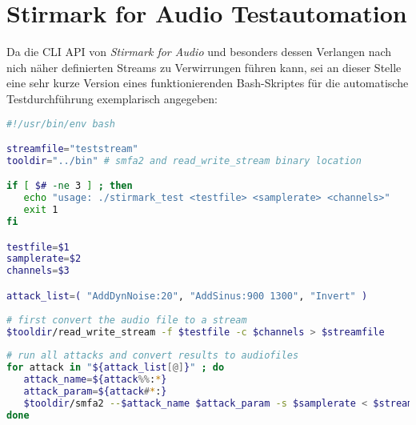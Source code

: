\chapter{Stirmark for Audio Testautomation}
\label{ch:stirmarkaudio}

Da die CLI API von \textit{Stirmark for Audio} und besonders dessen Verlangen nach nich näher definierten Streams  zu Verwirrungen führen kann, sei an dieser Stelle eine sehr kurze Version eines funktionierenden Bash-Skriptes für die automatische Testdurchführung exemplarisch angegeben:
      
\begin{lstlisting}[language=bash]
#!/usr/bin/env bash

streamfile="teststream"
tooldir="../bin" # smfa2 and read_write_stream binary location

if [ $# -ne 3 ] ; then
   echo "usage: ./stirmark_test <testfile> <samplerate> <channels>"
   exit 1
fi

testfile=$1
samplerate=$2
channels=$3

attack_list=( "AddDynNoise:20", "AddSinus:900 1300", "Invert" )
			
# first convert the audio file to a stream
$tooldir/read_write_stream -f $testfile -c $channels > $streamfile
 
# run all attacks and convert results to audiofiles
for attack in "${attack_list[@]}" ; do
   attack_name=${attack%%:*}
   attack_param=${attack#*:}
   $tooldir/smfa2 --$attack_name $attack_param -s $samplerate < $streamfile | $tooldir/read_write_stream -p -s $samplerate -c $channels -f ${testfile%.wav}-attacked-$attack_name-${attack_param// /-}.wav
done
\end{lstlisting}









